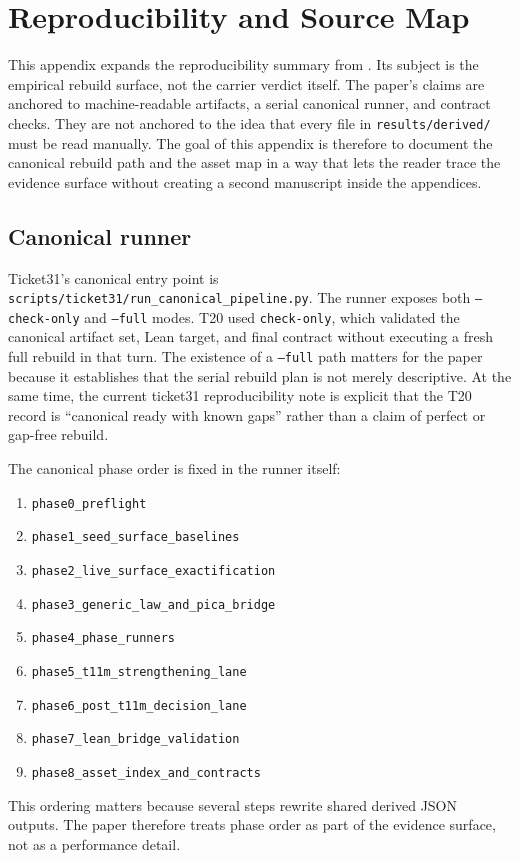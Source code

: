 \documentclass[11pt]{article}
\theoremstyle{definition}
\begin{document}
 \section{Reproducibility and Source Map}
\label{app:reproducibility-and-source-map}

This appendix expands the reproducibility summary from
. Its subject is the empirical rebuild surface,
not the carrier verdict itself. The paper's claims are anchored to machine-readable
artifacts, a serial canonical runner, and contract checks. They are not anchored to the
idea that every file in \nolinkurl{results/derived/} must be read manually. The goal of
this appendix is therefore to document the canonical rebuild path and the asset map in a
way that lets the reader trace the evidence surface without creating a second manuscript
inside the appendices.

\subsection{Canonical runner}

Ticket31's canonical entry point is
\nolinkurl{scripts/ticket31/run_canonical_pipeline.py}. The runner exposes both
\texttt{--check-only} and \texttt{--full} modes. T20 used \texttt{check-only}, which
validated the canonical artifact set, Lean target, and final contract without executing a
fresh full rebuild in that turn. The existence of a \texttt{--full} path matters for the
paper because it establishes that the serial rebuild plan is not merely descriptive. At
the same time, the current ticket31 reproducibility note is explicit that the T20 record is
``canonical ready with known gaps'' rather than a claim of perfect or gap-free rebuild.

The canonical phase order is fixed in the runner itself:
\begin{enumerate}[leftmargin=*]
\item \texttt{phase0\_preflight}
\item \texttt{phase1\_seed\_surface\_baselines}
\item \texttt{phase2\_live\_surface\_exactification}
\item \texttt{phase3\_generic\_law\_and\_pica\_bridge}
\item \texttt{phase4\_phase\_runners}
\item \texttt{phase5\_t11m\_strengthening\_lane}
\item \texttt{phase6\_post\_t11m\_decision\_lane}
\item \texttt{phase7\_lean\_bridge\_validation}
\item \texttt{phase8\_asset\_index\_and\_contracts}
\end{enumerate}
This ordering matters because several steps rewrite shared derived JSON outputs. The paper
therefore treats phase order as part of the evidence surface, not as a performance detail.
\end{document}
